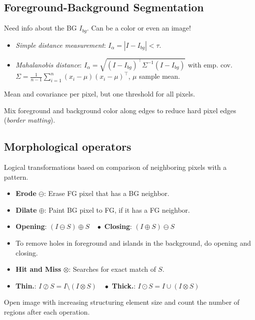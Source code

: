 \subsection{Foreground-Background Segmentation}
Need info about the BG \(I_{bg}\). Can be a color or even an image!
\begin{itemize}
  \item \textit{Simple distance measurement}: \(I_\alpha = |I - I_{bg}| < \tau\).
  \item \textit{Mahalanobis distance}: \(I_\alpha = \sqrt{(I - I_{bg})^\top \Sigma^{-1}(I - I_{bg})}\) with emp. cov. \(\Sigma = \frac{1}{n - 1} \sum_{i=1}^n (x_i - \mu) (x_i - \mu)^\top\), \(\mu\) sample mean.
\end{itemize}
Mean and covariance per pixel, but one threshold for all pixels.

\begin{definition}
  Mix foreground and background color along edges to reduce hard pixel edges (\textit{border matting}).
\end{definition}

\subsection{Morphological operators}
Logical transformations based on comparison of neighboring pixels with a pattern.
\begin{itemize}
  \item \textbf{Erode} \(\ominus\): Erase FG pixel that has a BG neighbor.
  \item \textbf{Dilate} \(\oplus\): Paint BG pixel to FG, if it has a FG neighbor.
  \item \textbf{Opening}: \((I \ominus S) \oplus S \quad \bullet\) \textbf{Closing}: \((I \oplus S) \ominus S\)
  \item To remove holes in foreground and islands in the background, do opening and closing.
  \item \textbf{Hit and Miss} \(\otimes\): Searches for exact match of $S$.
  \item \textbf{Thin.}: \(I \oslash S = I \setminus (I \otimes S) \quad \bullet\) \textbf{Thick.}: \(I \odot S = I \cup (I \otimes S)\)
\end{itemize}

\begin{definition}[Granulometry]
  Open image with increasing structuring element size and count the number of regions after each operation.
\end{definition}
